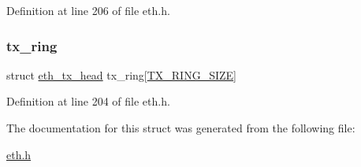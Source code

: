 Definition at line 206 of file eth.\+h.

\hypertarget{structeth__interface_a9fd2c4a1824efd32fbdb0bc85ae42abc}{}\label{structeth__interface_a9fd2c4a1824efd32fbdb0bc85ae42abc} 
\subsubsection{\texorpdfstring{tx\+\_\+ring}{tx\_ring}}
{\footnotesize\ttfamily struct \hyperlink{structeth__tx__head}{eth\+\_\+tx\+\_\+head} tx\+\_\+ring\mbox{[}\hyperlink{eth_8h_a530086d082c22e371518c2497c6d9014}{T\+X\+\_\+\+R\+I\+N\+G\+\_\+\+S\+I\+ZE}\mbox{]}}



Definition at line 204 of file eth.\+h.



The documentation for this struct was generated from the following file\+:\begin{DoxyCompactItemize}
\item 
\hyperlink{eth_8h}{eth.\+h}\end{DoxyCompactItemize}
